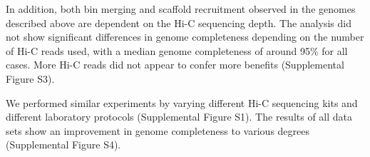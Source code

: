 \documentclass[fleqn,10pt,lineno]{wlpeerj}
\providecommand{\DIFdelbegin}{} %
\providecommand{\DIFdelend}{} %
\newcommand{\DIFscaledelfig}{0.5}
\newlength{\DIFdelgraphicswidth} %
\newlength{\DIFdelgraphicsheight} %
\newcommand{\DIFdelincludegraphics}[2][]{%
\sbox{\DIFdelgraphicsbox}{\DIFOincludegraphics[#1]{#2}}%
\settoboxwidth{\DIFdelgraphicswidth}{\DIFdelgraphicsbox} %
\settoboxtotalheight{\DIFdelgraphicsheight}{\DIFdelgraphicsbox} %
\scalebox{\DIFscaledelfig}{%
\parbox[b]{\DIFdelgraphicswidth}{\usebox{\DIFdelgraphicsbox}\\[-\baselineskip] \rule{\DIFdelgraphicswidth}{0em}}\llap{\resizebox{\DIFdelgraphicswidth}{\DIFdelgraphicsheight}{%
\setlength{\unitlength}{\DIFdelgraphicswidth}%
\begin{picture}(1,1)%
\thicklines\linethickness{2pt} %
{\color[rgb]{1,0,0}\put(0,0){\framebox(1,1){}}}%
{\color[rgb]{1,0,0}\put(0,0){\line( 1,1){1}}}%
{\color[rgb]{1,0,0}\put(0,1){\line(1,-1){1}}}%
\end{picture}%
}\hspace*{3pt}}} %
} %
\DeclareRobustCommand{\DIFdelbegin}{\DIFOdelbegin \let\includegraphics\DIFdelincludegraphics} %
\DeclareRobustCommand{\DIFdelend}{\DIFOaddend \let\includegraphics\DIFOincludegraphics} %
\begin{document}
\DIFdelbegin %


\DIFdelend In addition, both bin merging and scaffold recruitment observed in the genomes described above are dependent on the Hi-C sequencing depth. The analysis did not show significant differences in genome completeness depending on the number of Hi-C reads used, with a median genome completeness of around 95\% for all cases.  
More Hi-C reads did not appear to confer more benefits (Supplemental Figure S3).   

We performed similar experiments by varying different Hi-C sequencing kits and different laboratory protocols (Supplemental Figure S1). The results of all data sets show an improvement in genome completeness to various degrees (Supplemental Figure S4). 
\end{document}
